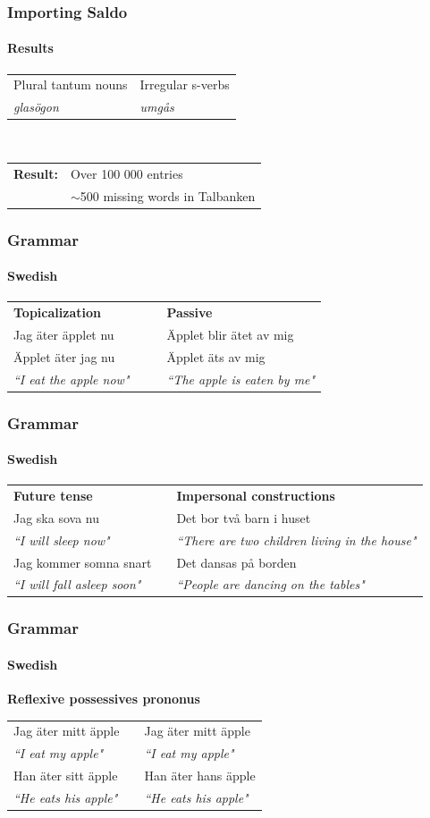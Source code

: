 \documentclass[10pt]{beamer}
\begin{document}
\begin{frame}
\frametitle{Importing Saldo}
\framesubtitle{Results} 
\begin{tabular}{ll}
Plural tantum nouns & Irregular s-verbs \\
\emph{glasögon} & \emph{umgås}\\
\end{tabular}\\
\vspace{5mm}
\begin{tabular}{ll}
\textbf{Result:} & Over 100 000 entries\\
\pause
&$\sim$500 missing words in Talbanken\\
\end{tabular}
\end{frame}

\begin{frame}
\frametitle{Grammar}
\framesubtitle{Swedish} 
\begin{tabular}{llll}
\textbf{Topicalization}& && \textbf{Passive}\\
Jag äter äpplet nu && &Äpplet blir ätet av mig \\
Äpplet äter jag nu &&& Äpplet äts av mig \\
\emph{``I eat the apple now"}& &&\emph{``The apple is eaten by me"}\\
\end{tabular}
\end{frame}

\begin{frame}
\frametitle{Grammar}
\framesubtitle{Swedish} 
\begin{tabular}{lll}
 \textbf{Future tense}  &&\textbf{Impersonal constructions} \\
Jag ska sova nu & &Det bor två barn i huset \\
\emph{``I will sleep now"} && \emph{``There are two children living in the house"} \\
Jag kommer somna snart &&Det dansas på borden  \\
\emph{``I will fall asleep soon"} &&\emph{``People are dancing on the tables"}  \\
\end{tabular}
\end{frame}

\begin{frame}
\frametitle{Grammar}
\framesubtitle{Swedish} 
\textbf{Reflexive possessives prononus}\\
\begin{tabular}{lll}
Jag äter mitt äpple && Jag äter mitt äpple \\
\emph{``I eat my apple"} && \emph{``I eat my apple"} \\
Han äter sitt äpple && Han äter hans äpple \\
\emph{``He eats his apple"} && \emph{``He eats his apple"} \\
\end{tabular}
\end{frame}
\end{document}
